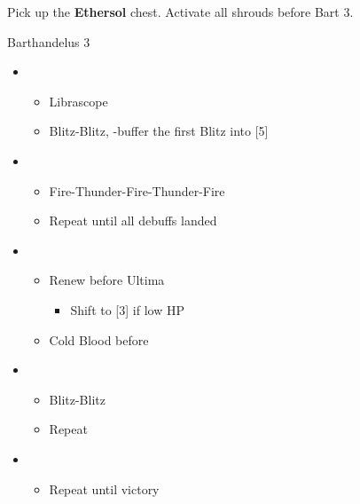 Pick up the \textbf{Ethersol} chest.
Activate all shrouds before Bart 3.

\begin{battle}{Barthandelus 3}
	\begin{itemize}
		\item \second
			\begin{itemize}
				\item Librascope
				\item Blitz-Blitz, \rav-buffer the first Blitz into [5]
			\end{itemize}
		\item \fifth
			\begin{itemize}
				\item Fire-Thunder-Fire-Thunder-Fire
				\item Repeat until all debuffs landed
			\end{itemize}
		\item \sixth
			\begin{itemize}
				\item Renew before Ultima
					\begin{itemize}
						\item Shift to [3] if low HP
					\end{itemize}
				\item Cold Blood before \stagger
			\end{itemize}
		\item \second
			\begin{itemize}
				\item Blitz-Blitz
				\item Repeat
			\end{itemize}
		\item \first
			\begin{itemize}
				\item Repeat until victory
			\end{itemize}
	\end{itemize}
\end{battle}

